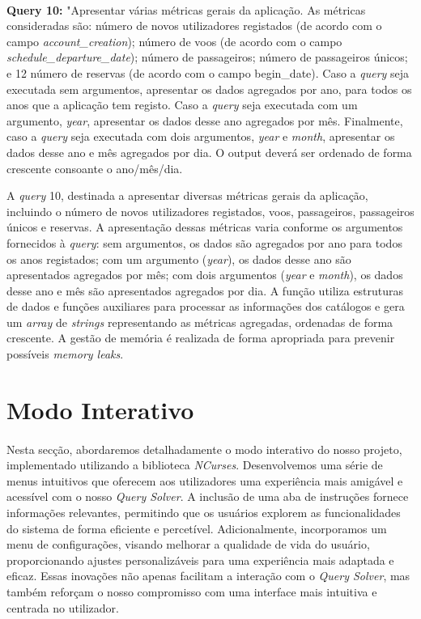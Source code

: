 \documentclass{article}
\begin{document}
\paragraph{}\textbf{Query 10:} "Apresentar várias métricas gerais da aplicação. As métricas consideradas são: número de novos utilizadores registados (de acordo com o campo \textit{account\_creation}); número de voos (de acordo com o campo \textit{schedule\_departure\_date}); número de passageiros; número de passageiros únicos; e 12 número de reservas (de acordo com o campo begin\_date). Caso a \textit{query} seja executada sem argumentos, apresentar os dados agregados por ano, para todos os anos que a aplicação tem registo. Caso a \textit{query} seja executada com um argumento, \textit{year}, apresentar os dados desse ano agregados por mês. Finalmente, caso a \textit{query} seja executada com dois argumentos, \textit{year} e \textit{month}, apresentar os dados desse ano e mês agregados por dia. O output deverá ser ordenado de forma crescente consoante o ano/mês/dia.


A \textit{query} 10, destinada a apresentar diversas métricas gerais da aplicação, incluindo o número de novos utilizadores registados, voos, passageiros, passageiros únicos e reservas. A apresentação dessas métricas varia conforme os argumentos fornecidos à \textit{query}: sem argumentos, os dados são agregados por ano para todos os anos registados; com um argumento (\textit{year}), os dados desse ano são apresentados agregados por mês; com dois argumentos (\textit{year} e \textit{month}), os dados desse ano e mês são apresentados agregados por dia. A função utiliza estruturas de dados e funções auxiliares para processar as informações dos catálogos e gera um \textit{array} de \textit{strings} representando as métricas agregadas, ordenadas de forma crescente. A gestão de memória é realizada de forma apropriada para prevenir possíveis \textit{memory leaks}.

\section{Modo Interativo}
\paragraph{}Nesta secção, abordaremos detalhadamente o modo interativo do nosso projeto, implementado utilizando a biblioteca \textit{NCurses}. Desenvolvemos uma série de menus intuitivos que oferecem aos utilizadores uma experiência mais amigável e acessível com o nosso \textit{Query Solver}. A inclusão de uma aba de instruções fornece informações relevantes, permitindo que os usuários explorem as funcionalidades do sistema de forma eficiente e percetível. Adicionalmente, incorporamos um menu de configurações, visando melhorar a qualidade de vida do usuário, proporcionando ajustes personalizáveis para uma experiência mais adaptada e eficaz. Essas inovações não apenas facilitam a interação com o \textit{Query Solver}, mas também reforçam o nosso compromisso com uma interface mais intuitiva e centrada no utilizador.
\end{document}
